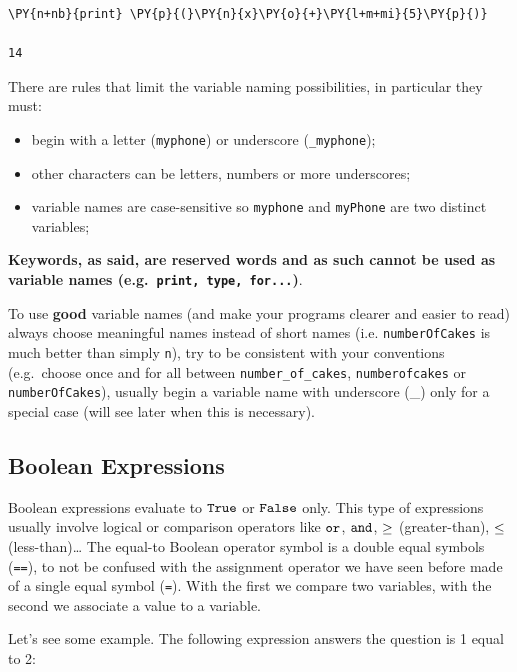 \begin{codebox}
\begin{Verbatim}[commandchars=\\\{\}]
\PY{n+nb}{print} \PY{p}{(}\PY{n}{x}\PY{o}{+}\PY{l+m+mi}{5}\PY{p}{)}

14
\end{Verbatim}
\end{codebox}

There are rules that limit the variable naming possibilities, in particular they must:
\begin{itemize}
	\tightlist
\item begin with a letter (\texttt{myphone}) or underscore (\texttt{\_myphone});
\item other characters can be letters, numbers or more underscores;
\item variable names are case-sensitive so \texttt{myphone} and \texttt{myPhone} are two distinct variables;
\end{itemize}

\textbf{Keywords, as said, are reserved words and as such cannot be used as variable names (e.g.~\texttt{print, type, for...})}.

To use \textbf{good} variable names (and make your programs clearer and easier to read) always choose meaningful names instead of short names (i.e. \texttt{numberOfCakes} is much better than simply \texttt{n}), try to be consistent with your conventions (e.g.~choose once and for all between \texttt{number\_of\_cakes}, \texttt{numberofcakes} or \texttt{numberOfCakes}), usually begin a variable name with underscore (\_) only for a special case (will see later when this is necessary).

\subsection{Boolean Expressions}\label{boolean-expressions}

Boolean expressions evaluate to \(\tt{True}\) or \(\tt{False}\) only. This type
of expressions usually involve logical or comparison operators like \(\tt{or}\), \(\tt{and}\), $\tt{\geq}$ (greater-than), $\tt{\leq}$ (less-than)\ldots
The equal-to Boolean operator symbol is a double equal symbols (\texttt{==}), to not be confused with the assignment operator we have seen before made of a single equal symbol (\texttt{=}). With the first we compare two variables, with the second we associate a value to a variable.

Let's see some example. The following expression answers the question is 1 equal to 2:

